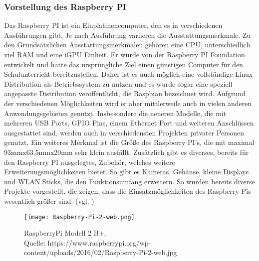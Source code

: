 
\subsubsection{Vorstellung des Raspberry PI}        
\label{sec:Vorstellung des Raspberry PI-1} 

Das Raspberry PI ist ein Einplatinencomputer, den es in verschiedenen Ausführungen gibt. Je nach Ausführung variieren die Ausstattungsmerkmale. Zu den Grundsätzlichen Ausstattungsmerkmalen gehören eine CPU, unterschiedlich viel RAM und eine iGPU Einheit. Er wurde von der Raspberry PI Foundation entwickelt und hatte das ursprüngliche Ziel einen günstigen Computer für den Schulunterricht bereitzustellen. Daher ist es auch möglich eine vollständige Linux Distribution als Betriebssystem zu nutzen und es wurde sogar eine speziell angepasste Distribution veröffentlicht, die Raspbian bezeichnet wird. 
Aufgrund der verschiedenen Möglichkeiten wird er aber mittlerweile auch in vielen anderen Anwendungsgebieten genutzt. Insbesondere die neueren Modelle, die mit mehreren USB Ports, GPIO Pins, einem Ethernet Port und weiteren Anschlüssen ausgestattet sind, werden auch in verschiedensten Projekten privater Personen genutzt. Ein weiteres Merkmal ist die Größe des Raspberry PI's, die mit maximal 93mmx63.5mmx20mm sehr klein ausfällt. Zusätzlich gibt es diverses, bereits für den Raspberry PI ausgelegtes, Zubehör, welches weitere Erweiterungsmöglichkeiten bietet. So gibt es Kameras, Gehäuse, kleine Displays und WLAN Sticks, die den Funktionsumfang erweitern. So wurden bereits diverse Projekte vorgestellt, die zeigen, dass die Einsatzmöglichkeiten des Raspberry Pis wesentlich größer sind. (vgl. \cite{.28.12.2016} \cite{.28.01.2017})
\\
\begin{figure}[!htb]
	\centering
	\texttt{[image: Raspberry-Pi-2-web.png]}
	\caption[RaspberryPi Modell 2 B]{RaspberryPi Modell 2 B+,\\ Quelle: https://www.raspberrypi.org/wp-content/uploads/2016/02/Raspberry-Pi-2-web.jpg}
\end{figure}


